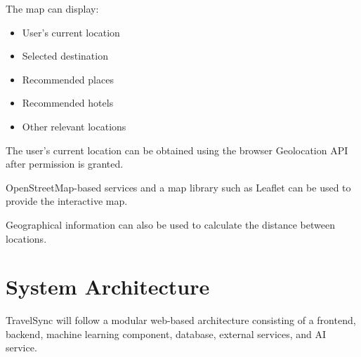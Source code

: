 \documentclass[11pt,a4paper]{article}
\begin{document}
The map can display:

\begin{itemize}
\item User's current location
\item Selected destination
\item Recommended places
\item Recommended hotels
\item Other relevant locations
\end{itemize}

The user's current location can be obtained using the browser Geolocation API after permission is granted.

OpenStreetMap-based services and a map library such as Leaflet can be used to provide the interactive map.

Geographical information can also be used to calculate the distance between locations.



\section{System Architecture}

TravelSync will follow a modular web-based architecture consisting of a frontend, backend, machine learning component, database, external services, and AI service.
\end{document}
